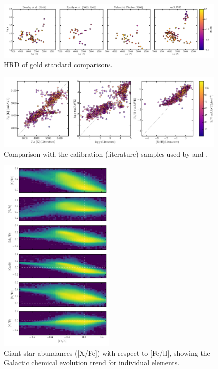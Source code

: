 \documentclass[preprint,trackchanges]{aastex}
\begin{document}
\begin{figure}[p]
\includegraphics[width=\textwidth]{figures/gold-standard-hrd.pdf}
\caption{HRD of gold standard comparisons.\label{fig:gold-standard-hrd}}
\end{figure}


\begin{figure}[p]
\includegraphics[width=\textwidth]{figures/kordopatis-calibration.pdf}
\caption{Comparison with the calibration (literature) samples used by \citet{Kordopatis_2013} and \citet{Kunder_2016}.\label{fig:kordopatis-calibration}}
\end{figure}

\begin{figure}[p]
\includegraphics[width=0.5\textwidth]{figures/gce.pdf}
\caption{Giant star abundances ([X/Fe]) with respect to [Fe/H], showing the Galactic chemical evolution trend for individual elements.\label{fig:gce}}
\end{figure}
\end{document}
